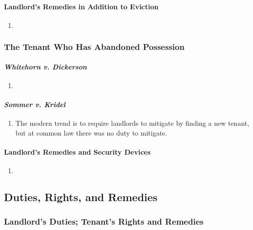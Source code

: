 \paragraph{Landlord's Remedies in Addition to Eviction} %

\begin{enumerate}
    \item 
\end{enumerate}

\subsubsection{The Tenant Who Has Abandoned Possession}

\paragraph{\emph{Whitehorn v. Dickerson}} %

\begin{enumerate}
    \item 
\end{enumerate}

\paragraph{\emph{Sommer v. Kridel}} %

\begin{enumerate}
    \item The modern trend is to require landlords to mitigate by finding a 
    new tenant, but at common law there was no duty to mitigate.
\end{enumerate}

\paragraph{Landlord's Remedies and Security Devices} %

\begin{enumerate}
    \item 
\end{enumerate}

\subsection{Duties, Rights, and Remedies}

\subsubsection{Landlord's Duties; Tenant's Rights and Remedies}

